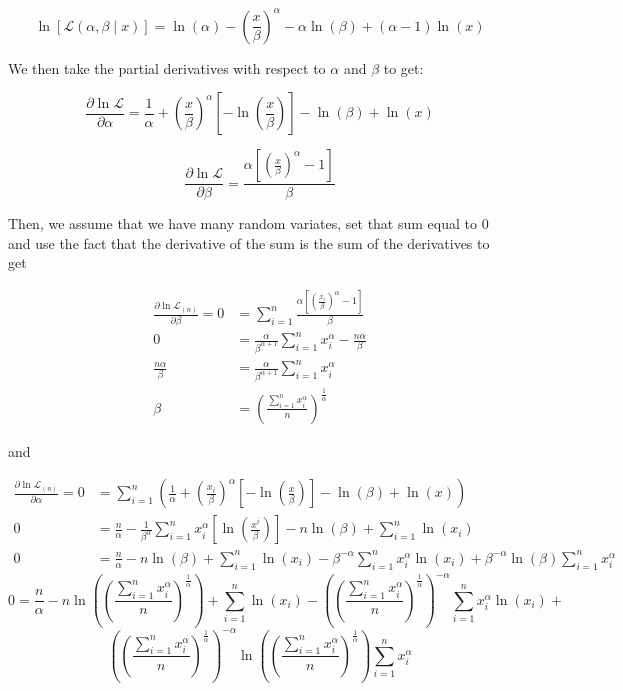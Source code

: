 \documentclass[11pt]{article} %
\newcommand{\like}{\mathcal{L}}
\begin{document}
\begin{enumerate}
$$\ln [\like(\alpha, \beta \;|\;x)] = \ln(\alpha) - \left(\frac{x}{\beta}\right)^\alpha - \alpha\ln(\beta) + (\alpha - 1)\ln(x)$$

We then take the partial derivatives with respect to $\alpha$ and $\beta$ to get:

$$\frac{\partial\ln\like}{\partial\alpha} = \frac{1}{\alpha} + \left(\frac{x}{\beta}\right)^\alpha\left[-\ln\left(\frac{x}{\beta}\right)\right] - \ln(\beta) + \ln(x)$$

$$\frac{\partial\ln\like}{\partial\beta} = \frac{\alpha\left[\left(\frac{x}{\beta}\right)^\alpha - 1\right]}{\beta}$$

Then, we assume that we have many random variates, set that sum equal to 0 and use the fact that the derivative of the sum is the sum of the derivatives to get 

\begin{align*}
\frac{\partial\ln\like_{(n)}}{\partial\beta} = 0 &= \sum_{i = 1}^n \frac{\alpha\left[\left(\frac{x_i}{\beta}\right)^\alpha - 1\right]}{\beta}\\
0&= \frac{\alpha}{\beta^{\alpha+1}}\sum_{i = 1}^nx_i^\alpha - \frac{n\alpha}{\beta}\\
\frac{n\alpha}{\beta} &= \frac{\alpha}{\beta^{\alpha+1}}\sum_{i = 1}^nx_i^\alpha\\
\beta &= \left(\frac{\sum_{i = 1}^nx_i^\alpha}{n}\right)^{\frac{1}{\alpha}}
\end{align*}

and

\begin{align*}
\frac{\partial\ln\like_(n)}{\partial\alpha} = 0 & = \sum_{i = 1}^n\left(\frac{1}{\alpha} + \left(\frac{x_i}{\beta}\right)^\alpha\left[-\ln\left(\frac{x}{\beta}\right)\right] - \ln(\beta) + \ln(x)\right)\\
0 &= \frac{n}{\alpha} - \frac{1}{\beta^\alpha}\sum_{i = 1}^nx_i^\alpha\left[\ln\left(\frac{x^i}{\beta}\right)\right] - n\ln(\beta) + \sum_{i = 1}^n\ln(x_i)\\
0 &= \frac{n}{\alpha} - n\ln(\beta) + \sum_{i = 1}^n\ln(x_i) - \beta^{-\alpha}\sum_{i = 1}^nx_i^\alpha\ln(x_i) + \beta^{-\alpha}\ln(\beta)\sum_{i = 1}^nx_i^{\alpha}
\end{align*}
$$0 = \frac{n}{\alpha} - n\ln\left(\left(\frac{\sum_{i = 1}^nx_i^\alpha}{n}\right)^{\frac{1}{\alpha}}\right) + \sum_{i = 1}^n\ln(x_i) - \left(\left(\frac{\sum_{i = 1}^nx_i^\alpha}{n}\right)^{\frac{1}{\alpha}}\right)^{-\alpha}\sum_{i = 1}^nx_i^\alpha\ln(x_i) +$$
$$\left(\left(\frac{\sum_{i = 1}^nx_i^\alpha}{n}\right)^{\frac{1}{\alpha}}\right)^{-\alpha}\ln\left(\left(\frac{\sum_{i = 1}^nx_i^\alpha}{n}\right)^{\frac{1}{\alpha}}\right)\sum_{i = 1}^nx_i^{\alpha}$$


\end{enumerate}
\end{document}
